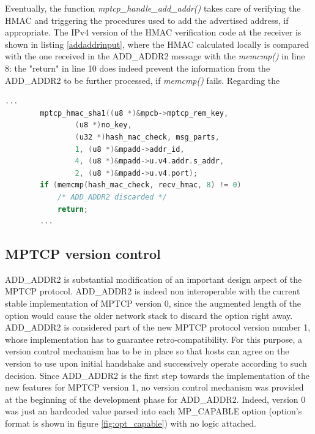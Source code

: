 Eventually, the function \textit{mptcp\_handle\_add\_addr()} takes care of verifying the HMAC and triggering the procedures used to add the advertised address, if appropriate. The IPv4 version of the HMAC verification code at the receiver is shown in listing \ref{addaddrinput}, where the HMAC calculated locally is compared with the one received in the ADD\_ADDR2 message with the \textit{memcmp()} in line 8: the "return" in line 10 does indeed prevent the information from the ADD\_ADDR2 to be further processed, if \textit{memcmp()} fails. Regarding the 

\begin{lstlisting}[language=c, caption=\textit{New ADD\_ADDR HMAC calculation (incoming packet)}, label=addaddrinput]
        ...
		mptcp_hmac_sha1((u8 *)&mpcb->mptcp_rem_key,
				(u8 *)no_key,
				(u32 *)hash_mac_check, msg_parts,
				1, (u8 *)&mpadd->addr_id,
				4, (u8 *)&mpadd->u.v4.addr.s_addr,
				2, (u8 *)&mpadd->u.v4.port);
		if (memcmp(hash_mac_check, recv_hmac, 8) != 0)
			/* ADD_ADDR2 discarded */
			return;
		...
\end{lstlisting}


\subsection{MPTCP version control}
\label{retrocomp}
ADD\_ADDR2 is substantial modification of an important design aspect of the MPTCP protocol. ADD\_ADDR2 is indeed non interoperable with the current stable implementation of MPTCP version 0, since the augmented length of the option would cause the older network stack to discard the option right away.
ADD\_ADDR2 is considered part of the new MPTCP protocol version number 1, whose implementation has to guarantee retro-compatibility. For this purpose, a version control mechanism has to be in place so that hosts can agree on the version to use upon initial handshake and successively operate according to such decision. Since ADD\_ADDR2 is the first step towards the implementation of the new features for MPTCP version 1, no version control mechanism was provided at the beginning of the development phase for ADD\_ADDR2. Indeed, version 0 was just an hardcoded value parsed into each MP\_CAPABLE option (option's format is shown in figure \ref{fig:opt_capable}) with no logic attached.


